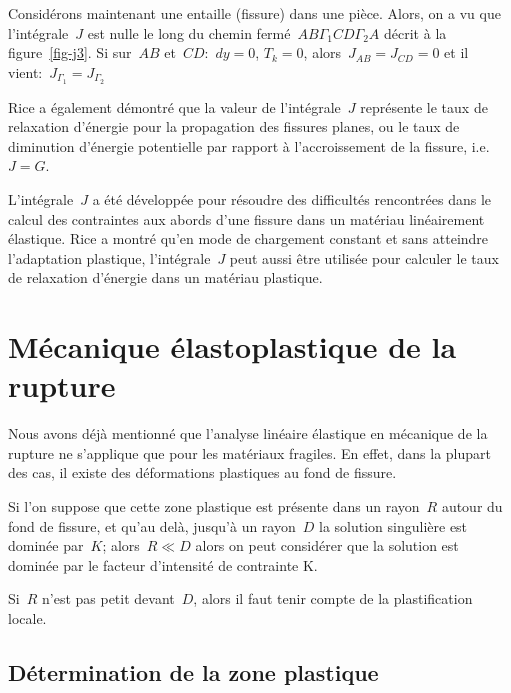 \medskipvm
Considérons maintenant une entaille (fissure) dans une pièce.
Alors, on a vu que l'intégrale~$J$ est nulle le long du chemin fermé~$AB\Gamma_1CD\Gamma_2A$ décrit
à la figure~\ref{fig-j3}.
Si sur~$AB$ et~$CD$:~$dy=0$, $T_k=0$, alors~$J_{AB}=J_{CD}=0$
et il vient:~$J_{\Gamma_1} = J_{\Gamma_2}$

\medskip
Rice a également démontré que la valeur de
l'intégrale~$J$ représente le taux de relaxation
d'énergie pour la propagation des fissures planes,
ou le taux de diminution d'énergie potentielle par rapport à l'accroissement de la fissure, i.e.~$J=G$.

\medskip
L'intégrale~$J$ a été développée pour résoudre des difficultés rencontrées dans le calcul des
contraintes aux abords d'une fissure dans un matériau linéairement élastique.
Rice a montré qu'en mode de chargement constant et
sans atteindre l'adaptation plastique, l'intégrale~$J$ peut aussi être utilisée pour
calculer le taux de relaxation d'énergie dans un matériau plastique.






\medskip
\section{Mécanique élastoplastique de la rupture}

Nous avons déjà mentionné que l'analyse linéaire élastique en mécanique de la rupture
ne s'applique que pour les matériaux fragiles.
En effet, dans la plupart des cas, il existe des déformations plastiques au fond de
fissure.

Si l'on suppose que cette zone plastique est présente dans un rayon~$R$ autour
du fond de fissure, et qu'au delà, jusqu'à un rayon~$D$ la solution singulière est
dominée par~$K$; alors~$R \ll D$ alors on peut considérer que la solution est dominée
par le facteur d'intensité de contrainte K.

Si~$R$ n'est pas petit devant~$D$, alors il faut tenir compte de la plastification locale.

\medskip
\subsection{Détermination de la zone plastique}

